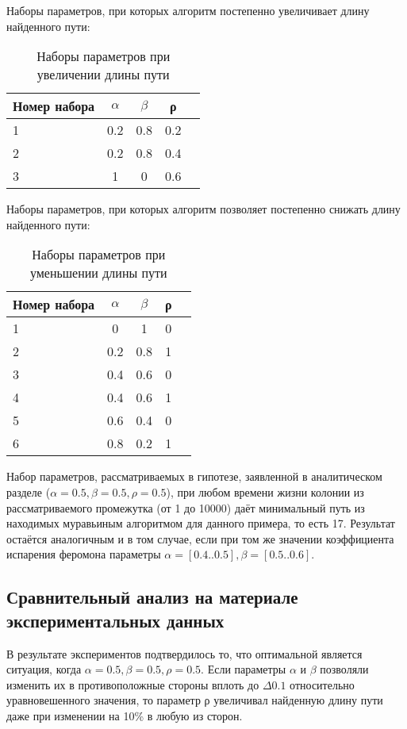 \documentclass[12pt,a4paper]{scrartcl}
\begin{document}
Наборы параметров, при которых алгоритм постепенно увеличивает длину найденного пути:

\begin{table}[ht]
	\caption{Наборы параметров при увеличении длины пути}
	\begin{tabular}{|l|c|c|c|c|}
		\hline
		Номер набора & $\alpha$ & $\beta$ & ρ\\
		\hline
		\hline
		1 & 0.2 & 0.8 & 0.2 \\
		\hline
		2 & 0.2 & 0.8 & 0.4 \\
		\hline
		3 & 1 & 0 & 0.6 \\
		\hline
	\end{tabular}
	\label{tab:tabular}
\end{table}

Наборы параметров, при которых алгоритм позволяет постепенно снижать длину найденного пути:

\begin{table}[ht]
	\caption{Наборы параметров при уменьшении длины пути}
	\begin{tabular}{|l|c|c|c|c|}
		\hline
		Номер набора & $\alpha$ & $\beta$ & ρ\\
		\hline
		\hline
		1 & 0 & 1 & 0 \\
		\hline
		2 & 0.2 & 0.8 & 1 \\
		\hline
		3 & 0.4 & 0.6 & 0 \\
		\hline
		4 & 0.4 & 0.6 & 1 \\
		\hline
		5 & 0.6 & 0.4 & 0 \\
		\hline
		6 & 0.8 & 0.2 & 1 \\
		\hline
	\end{tabular}
	\label{tab:tabular}
\end{table}

Набор параметров, рассматриваемых в гипотезе, заявленной в аналитическом разделе ($\alpha = 0.5, \beta = 0.5, ρ = 0.5$), при любом времени жизни колонии из рассматриваемого промежутка (от 1 до 10000) даёт минимальный путь из находимых муравьиным алгоритмом для данного примера, то есть 17. Результат остаётся аналогичным и в том случае, если при том же значении коэффициента испарения феромона параметры $\alpha = [0.4..0.5], \beta = [0.5..0.6]$.

\subsection{Сравнительный анализ на материале экспериментальных данных} 

В результате экспериментов подтвердилось то, что оптимальной является ситуация, когда $\alpha = 0.5, \beta = 0.5, ρ = 0.5$. Если параметры $\alpha$ и $\beta$ позволяли изменить их в противоположные стороны вплоть до $\Delta0.1$ относительно уравновешенного значения, то параметр ρ увеличивал найденную длину пути даже при изменении на 10\% в любую из сторон. 
\end{document}
